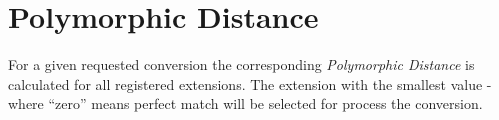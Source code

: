 \section{Polymorphic Distance}
\label{feature:PolymorphicDistance}
For a given requested conversion the corresponding \emph{Polymorphic Distance} is calculated for all registered extensions. The extension with the smallest value - where ``zero'' means perfect match will be selected for process the conversion.

\TODO